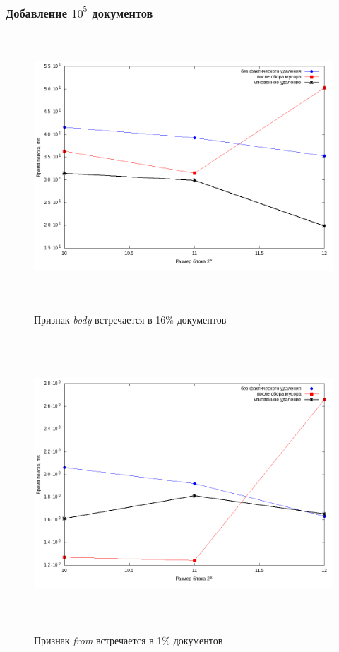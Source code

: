 \subsubsection{Добавление $10^5$ документов}

\begin{figure}[H]
\includegraphics[width=\linewidth, height=10cm]{fig/limit_1e6/1e5/body.png}
\caption{Признак \textit{body} встречается в 16\% документов}
\includegraphics[width=\linewidth, height=11cm]{fig/limit_1e6/1e5/from.png}
\caption{Признак \textit{from} встречается в 1\% документов}
\end{figure}

